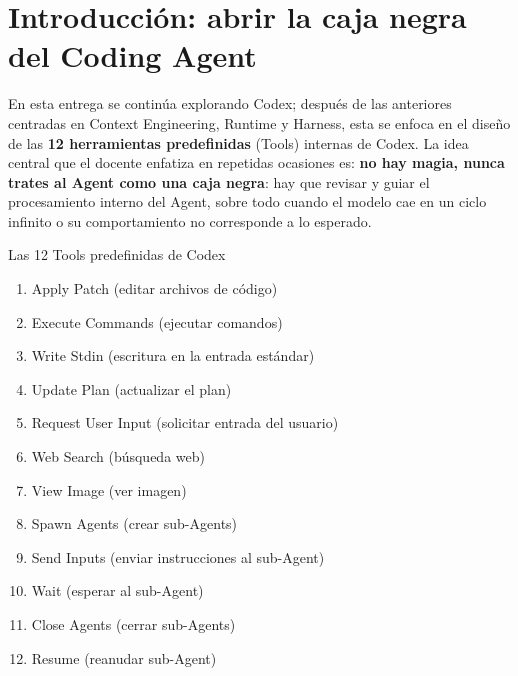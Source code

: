 \section{Introducción: abrir la caja negra del Coding Agent}

En esta entrega se continúa explorando Codex; después de las anteriores centradas en Context Engineering, Runtime y Harness, esta se enfoca en el diseño de las \textbf{12 herramientas predefinidas} (Tools) internas de Codex. La idea central que el docente enfatiza en repetidas ocasiones es: \textbf{no hay magia, nunca trates al Agent como una caja negra}: hay que revisar y guiar el procesamiento interno del Agent, sobre todo cuando el modelo cae en un ciclo infinito o su comportamiento no corresponde a lo esperado.

\begin{knowledgebox}{Las 12 Tools predefinidas de Codex}
\begin{enumerate}
    \item Apply Patch (editar archivos de código)
    \item Execute Commands (ejecutar comandos)
    \item Write Stdin (escritura en la entrada estándar)
    \item Update Plan (actualizar el plan)
    \item Request User Input (solicitar entrada del usuario)
    \item Web Search (búsqueda web)
    \item View Image (ver imagen)
    \item Spawn Agents (crear sub-Agents)
    \item Send Inputs (enviar instrucciones al sub-Agent)
    \item Wait (esperar al sub-Agent)
    \item Close Agents (cerrar sub-Agents)
    \item Resume (reanudar sub-Agent)
\end{enumerate}
\end{knowledgebox}

